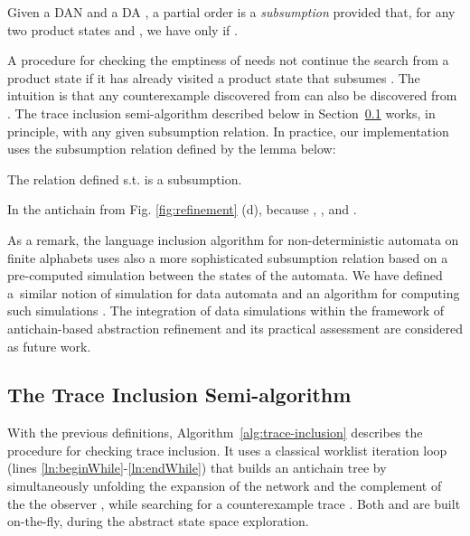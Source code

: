 \documentclass{llncs}
\begin{document}
\begin{definition}\label{def:subsumption}
  Given a DAN  and a DA , a partial order
   is a \emph{subsumption} provided that, for any two
  product states  and , we have  only if
  .
\end{definition}

A procedure for checking the emptiness of 
needs not continue the search from a product state  if it has already visited
a product state  that subsumes . The intuition is that any counterexample
discovered from  can also be discovered from . The trace inclusion
semi-algorithm described below in Section~\ref{sec:trace-inclusion-algorithm}
works, in principle, with any given subsumption relation. In practice, our
implementation uses the subsumption relation defined by the lemma below:

\begin{lemma}\label{lemma:img-subsumption} The relation defined s.t.
 is a
subsumption.\end{lemma}

\begin{example} In the antichain from Fig. \ref{fig:refinement} (d), 
  because , , and .  \end{example}

As a remark, the language inclusion algorithm for non-deterministic
automata on finite alphabets \cite{abdulla} uses also a more
sophisticated subsumption relation based on a pre-computed simulation
\cite{milner} between the states of the automata. We have defined
a~similar notion of simulation for data automata and an algorithm for
computing such simulations \cite{tech-report}. The integration of data
simulations within the framework of antichain-based abstraction
refinement and its practical assessment are considered as future work.

\subsection{The Trace Inclusion Semi-algorithm}
\label{sec:trace-inclusion-algorithm}


With the previous definitions, Algorithm~\ref{alg:trace-inclusion} describes the
procedure for checking trace inclusion. It uses a classical worklist iteration
loop (lines \ref{ln:beginWhile}-\ref{ln:endWhile}) that builds an antichain tree
by simultaneously unfolding the expansion  of the network
 and the complement  of the the observer , while
searching for a counterexample trace . Both  and  are built on-the-fly,
during the abstract state space exploration. 
\end{document}
